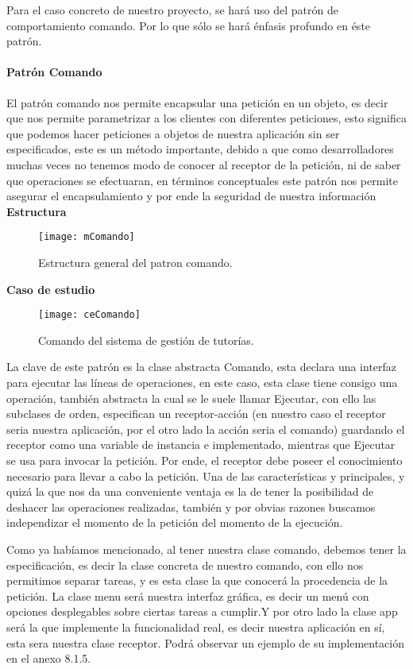 Para el caso concreto de nuestro proyecto, se hará uso del patrón de comportamiento comando. Por lo que sólo se hará énfasis profundo en éste patrón.
\paragraph{Patrón Comando}
El patrón comando nos permite encapsular una petición en un objeto, es decir que nos permite parametrizar a los clientes con diferentes peticiones, esto significa que podemos hacer peticiones a objetos de nuestra aplicación sin ser especificados, este es un método importante, debido a que como desarrolladores muchas veces no tenemos modo de conocer al receptor de la petición, ni de saber que operaciones se efectuaran, en términos conceptuales este patrón nos permite asegurar el encapsulamiento y por ende la seguridad de nuestra información
\newline
\indent\textbf{Estructura}
\begin{figure}[H]
	\centering
	\texttt{[image: mComando]}
    \centering
    \caption{Estructura general del patron comando.}
	\label{fig:mComando}
\end{figure}
\clearpage
\indent\textbf{Caso de estudio}
\begin{figure}[H]
	\centering
	\texttt{[image: ceComando]}
    \centering
    \caption{Comando del sistema de gestión de tutorías.}
	\label{fig:ceComando}
\end{figure}
\indent La clave de este patrón es la clase abstracta Comando, esta declara una interfaz para ejecutar las líneas de operaciones, en este caso, esta clase tiene consigo una operación, también abstracta la cual se le suele llamar Ejecutar, con ello las subclases de orden, especifican un receptor-acción (en nuestro caso el receptor seria nuestra aplicación, por el otro lado la acción seria el comando) guardando el receptor como una variable de instancia e implementado, mientras que Ejecutar se usa para invocar la petición. Por ende, el receptor debe poseer el conocimiento necesario para llevar a cabo la petición. Una de las características y principales, y quizá la que nos da una conveniente ventaja es la de tener la posibilidad de deshacer las operaciones realizadas, también y por obvias razones buscamos independizar el momento de la petición del momento de la ejecución.
\newline

Como ya habíamos mencionado, al tener nuestra clase comando, debemos tener la especificación, es decir la clase concreta de nuestro comando, con ello nos permitimos separar tareas, y es esta clase la que conocerá la procedencia de la petición.  La clase menu será nuestra interfaz gráfica, es decir un menú con opciones desplegables sobre ciertas tareas a cumplir.Y por otro lado la clase app será la que implemente la funcionalidad real, es decir nuestra aplicación en sí, esta sera nuestra clase receptor. Podrá observar un ejemplo de su implementación en el anexo 8.1.5.
\newpage
